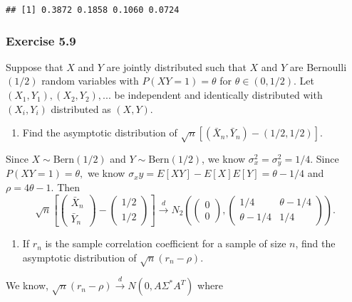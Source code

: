 \documentclass[12pt,]{article}
\providecommand{\tightlist}{%
  \setlength{\itemsep}{0pt}\setlength{\parskip}{0pt}}
\begin{document}
\begin{verbatim}
## [1] 0.3872 0.1858 0.1060 0.0724
\end{verbatim}

\hypertarget{exercise-5.9}{%
\subsubsection{Exercise 5.9}\label{exercise-5.9}}

Suppose that \(X\) and \(Y\) are jointly distributed such that \(X\) and
\(Y\) are Bernoulli \((1/2)\) random variables with \(P(XY=1)=\theta\)
for \(\theta\in (0,1/2)\). Let \((X_1,Y_1), (X_2,Y_2),...\) be
independent and identically distributed with \((X_i, Y_i)\) distributed
as \((X,Y)\).

\begin{enumerate}
\def\labelenumi{(\alph{enumi})}
\tightlist
\item
  Find the asymptotic distribution of
  \(\sqrt{n}[(\bar X_n, \bar Y_n) - (1/2, 1/2)].\)
\end{enumerate}

Since \(X\sim\text{Bern}(1/2)\) and \(Y\sim\text{Bern}(1/2)\), we know
\(\sigma_x^2 = \sigma_y^2 = 1/4\). Since \(P(XY=1)=\theta,\) we know
\(\sigma_xy = E[XY]-E[X]E[Y]=\theta-1/4\) and \(\rho = 4\theta - 1.\)
Then
\[\sqrt{n}\left[\begin{pmatrix}\bar X_n \\ \bar Y_n\end{pmatrix}-\begin{pmatrix}1/2 \\ 1/2\end{pmatrix}\right]\overset{d}\rightarrow N_2\left(\begin{pmatrix}0 \\ 0\end{pmatrix}, \begin{pmatrix} 1/4 & \theta-1/4 \\ \theta - 1/4 & 1/4\end{pmatrix}\right).\]

\begin{enumerate}
\def\labelenumi{(\alph{enumi})}
\setcounter{enumi}{1}
\tightlist
\item
  If \(r_n\) is the sample correlation coefficient for a sample of size
  \(n\), find the asymptotic distribution of \(\sqrt{n}(r_n-\rho).\)
\end{enumerate}

We know,
\(\sqrt{n}(r_n-\rho) \overset{d}\rightarrow N(0, A\Sigma^{*} A^T)\)
where
\end{document}
